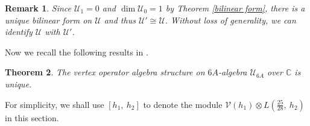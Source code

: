\documentclass{article}
\newtheorem{lemma}{Lemma}[section]
\newtheorem{theorem}[lemma]{Theorem}
\newtheorem{remark}[lemma]{Remark}
\begin{document}
	\begin{remark} \label{self-dual}
		Since $\mathcal{U}_{1}=0$ and $\dim\mathcal{U}_{0}=1$ by Theorem
		\ref{bilinear form}, there is a unique bilinear form on $\mathcal{U}$
		and thus $\mathcal{U}'\cong\mathcal{U}$. Without loss of generality,
		we can identify $\mathcal{U}$ with $\mathcal{U}'$.
	\end{remark}   
	
	Now we recall the following results in \cite{DJY}.
	
	
	\begin{theorem}\label{uniqueness of 6A-algebra}
		The vertex operator algebra structure on $6A$-algebra $\mathcal{U}_{6A}$
		over $\mathbb{C}$ is unique.     
	\end{theorem}
	
	For simplicity, we shall use $[h_{1},\ h_{2}]$
	to denote the module $\mathcal{V}(h_{1})\otimes L(\frac{25}{28},\ h_{2})$ in this section.
	
\end{document}
